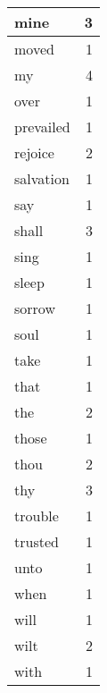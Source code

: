 \begin{center}
\begin{longtable}{l|r}
mine & 3 \\ \hline
moved & 1 \\ \hline
my & 4 \\ \hline
over & 1 \\ \hline
prevailed & 1 \\ \hline
rejoice & 2 \\ \hline
salvation & 1 \\ \hline
say & 1 \\ \hline
shall & 3 \\ \hline
sing & 1 \\ \hline
sleep & 1 \\ \hline
sorrow & 1 \\ \hline
soul & 1 \\ \hline
take & 1 \\ \hline
that & 1 \\ \hline
the & 2 \\ \hline
those & 1 \\ \hline
thou & 2 \\ \hline
thy & 3 \\ \hline
trouble & 1 \\ \hline
trusted & 1 \\ \hline
unto & 1 \\ \hline
when & 1 \\ \hline
will & 1 \\ \hline
wilt & 2 \\ \hline
with & 1 \\ \hline
\end{longtable}
\end{center}



\normalsize



